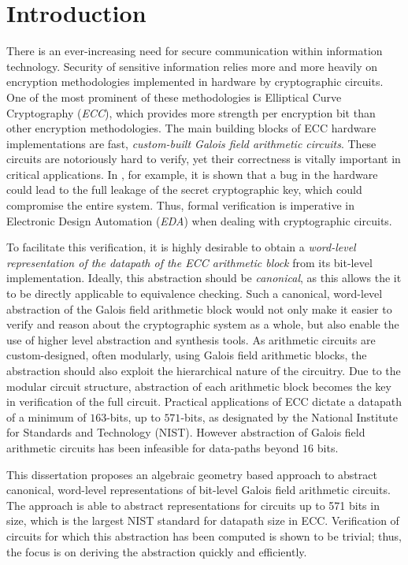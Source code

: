 \chapter{Introduction} \label{ch:intro}
There is an ever-increasing need for secure communication within information 
technology. Security of sensitive information relies more and more heavily 
on encryption methodologies implemented in hardware by cryptographic 
circuits. One of the most prominent of these methodologies is Elliptical 
Curve Cryptography (\emph{ECC}), which provides more strength per encryption bit 
than other encryption methodologies.
The main building blocks of ECC hardware implementations 
are fast, \emph{custom-built Galois field arithmetic circuits}.
These circuits are notoriously hard to verify, yet their correctness is 
vitally important in critical applications. In \cite{crypto:bug_attacks}, 
for example, it is shown that a bug in the hardware could lead to the full 
leakage of the secret cryptographic key, which could compromise the entire
system. Thus, formal verification is imperative in Electronic Design 
Automation (\emph{EDA}) when dealing with cryptographic circuits.

To facilitate this verification, it is highly desirable to obtain a {\it word-level 
representation of the datapath of the ECC arithmetic block} from its 
bit-level implementation. Ideally, this abstraction should be {\it canonical},
as this allows the it to be directly applicable to equivalence checking. 
Such a canonical, word-level abstraction of the 
Galois field arithmetic block would not only make it easier to verify and 
reason 
about the cryptographic system as a whole, but also enable the use of 
higher level abstraction and synthesis tools. 
As arithmetic circuits are custom-designed, often modularly, using Galois field arithmetic blocks, 
the abstraction should also exploit the hierarchical nature of the circuitry.
Due to the modular circuit structure, abstraction of each arithmetic block
becomes the key in verification of the full circuit. 
Practical 
applications of ECC dictate a datapath of a minimum of $163$-bits, up to 
$571$-bits, as 
designated by the National Institute for Standards and Technology (NIST).
However abstraction of 
Galois field arithmetic circuits has been infeasible for data-paths beyond 
$16$ bits. 

This dissertation proposes an algebraic geometry based approach to abstract canonical, 
word-level representations of bit-level Galois field arithmetic circuits.
The approach is able to abstract representations
for circuits up to 571 bits in size, which is the largest NIST
standard for datapath size in ECC. 
Verification of circuits for which this abstraction has been computed is shown to 
be trivial; thus, the focus is on deriving the abstraction quickly and efficiently.

